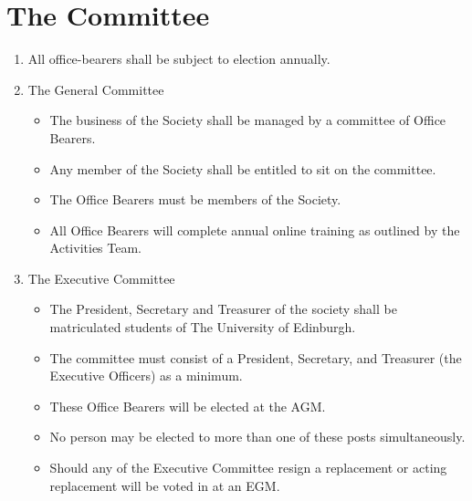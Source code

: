 \section{The Committee}

\begin{enumerate}

\item All office-bearers shall be subject to election annually.

\item The General Committee
  \begin{itemize}
  \item The business of the Society shall be managed by a committee of Office Bearers.
  \item Any member of the Society shall be entitled to sit on the committee.
  \item The Office Bearers must be members of the Society.
  \item All Office Bearers will complete annual online training as outlined by the Activities Team.
  \end{itemize}

\item The Executive Committee
  \begin{itemize}
  \item The President, Secretary and Treasurer of the society shall be matriculated students of The University of Edinburgh.
  \item The committee must consist of a President, Secretary, and Treasurer (the Executive Officers) as a minimum.
  \item These Office Bearers will be elected at the AGM\@.
  \item No person may be elected to more than one of these posts simultaneously.
  \item Should any of the Executive Committee resign a replacement or acting replacement will be voted in at an EGM\@.
  \end{itemize}
\end{enumerate}

\newpage

